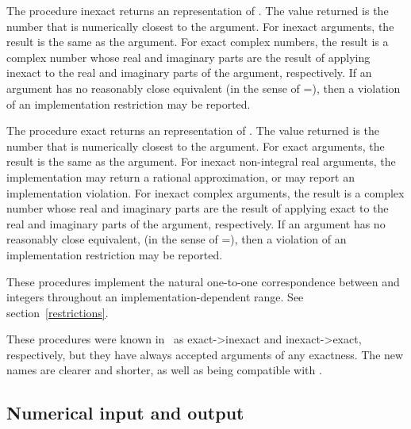 \begin{entry}{
}

The procedure {\cf inexact} returns an  representation of .
The value returned is the
 number that is numerically closest to the argument.
For inexact arguments, the result is the same as the argument. For exact
complex numbers, the result is a complex number whose real and imaginary
parts are the result of applying {\cf inexact} to the real
and imaginary parts of the argument, respectively.
If an  argument has no reasonably close  equivalent
(in the sense of {\cf =}),
then a violation of an implementation restriction may be reported.

The procedure {\cf exact} returns an  representation of
.  The value returned is the  number that is numerically
closest to the argument.
For exact arguments, the result is the same as the argument. For inexact
non-integral real arguments, the implementation may return a rational
approximation, or may report an implementation violation. For inexact
complex arguments, the result is a complex number whose real and
imaginary parts are the result of applying {\cf exact} to the
real and imaginary parts of the argument, respectively.
If an  argument has no reasonably close  equivalent,
(in the sense of {\cf =}),
then a violation of an implementation restriction may be reported.

These procedures implement the natural one-to-one correspondence between
 and  integers throughout an
implementation-dependent range.  See section~\ref{restrictions}.

\begin{note}
These procedures were known in \rfivers\ as {\cf exact->inexact} and
{\cf inexact->exact}, respectively, but they have always accepted
arguments of any exactness.  The new names are clearer and shorter,
as well as being compatible with \rsixrs.
\end{note}

\end{entry}

\medskip

\subsection{Numerical input and output}

